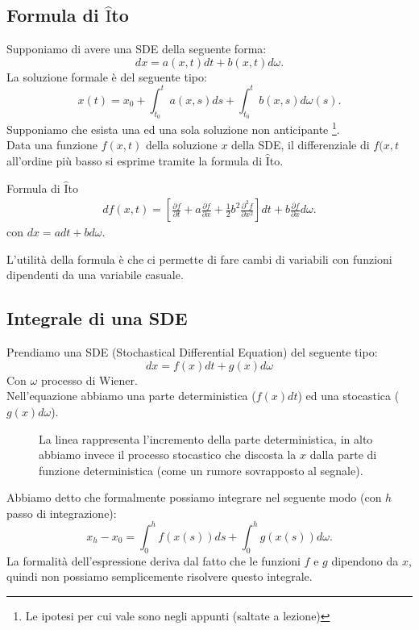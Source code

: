 \subsection{Formula di $\hat{\text{I}}$to}%
\label{sub:Formula di ITO}
Supponiamo di avere una SDE della seguente forma:
\[
    dx = a(x,t) dt + b(x,t) d\omega
.\] 
La soluzione formale è del seguente tipo:
\[
    x(t) = x_0 + \int_{t_0}^{t} a(x,s) ds + \int_{t_0}^{t} b(x,s) d\omega (s)   
.\] 
Supponiamo che esista una ed una sola soluzione non anticipante
\footnote{Le ipotesi per cui vale sono negli appunti (saltate a lezione)}. \\
Data una funzione $f(x,t)$ della soluzione $x$ della SDE, il differenziale di $f(x, t$ all'ordine più basso si esprime tramite la formula di $\hat{\text{I}}$to.
\begin{redbox}{Formula di $\hat{\text{I}}$to}
    \[\begin{aligned}
	df(x,t) = 
	\left[\frac{\partial f}{\partial t} + 
	a \frac{\partial f}{\partial x} +
        \frac{1}{2}b^2 \frac{\partial ^2 f}{\partial x^2} \right] dt +
	b\frac{\partial f}{\partial x} d\omega 
    .\end{aligned}\]
    con $dx = adt + bd\omega$.
\end{redbox}
\noindent
L'utilità della formula è che ci permette di fare cambi di variabili con funzioni dipendenti da una variabile casuale.

\subsection{Integrale di una SDE}%
\label{sub:Integrale di una SDE}
Prendiamo una SDE (Stochastical Differential Equation) del seguente tipo:
\begin{equation}
    dx = f(x) dt + g(x) d\omega
    \label{eq:sde}
\end{equation}
Con $\omega$ processo di Wiener. \\
Nell'equazione abbiamo una parte deterministica ($f(x) dt$) ed una stocastica ($g(x)d\omega$).
\begin{figure}[H]
    \centering
    \caption{\scriptsize La linea rappresenta l'incremento della parte deterministica, in alto abbiamo invece il processo stocastico che discosta la $x$ dalla parte di funzione deterministica (come un rumore sovrapposto al segnale).}
    \label{fig:lez_7_int}
\end{figure}
\noindent
Abbiamo detto che formalmente possiamo integrare nel seguente modo (con $h$  passo di integrazione):
\[
    x_h - x_0 = \int_{0}^{h}  f(x(s) ) ds + \int_{0}^{h} g(x(s)) d\omega
.\] 
La formalità dell'espressione deriva dal fatto che le funzioni $f$ e $g$ dipendono da $x$, quindi non possiamo semplicemente risolvere questo integrale.
